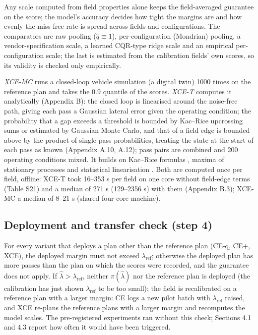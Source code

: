 \documentclass[preprint,12pt,authoryear]{elsarticle}
\begin{document}
Any scale computed from field properties alone keeps the field-averaged guarantee on the score; the model's accuracy decides how tight the margins are and how evenly the miss-free rate is spread across fields and configurations. The comparators are raw pooling (\(\hat q\equiv1\)), per-configuration (Mondrian) pooling, a vendor-specification scale, a learned CQR-type ridge scale \citep{romano2019} and an empirical per-configuration scale; the last is estimated from the calibration fields' own scores, so its validity is checked only empirically.

\emph{XCE-MC} runs a closed-loop vehicle simulation (a digital twin) 1000 times on the reference plan and takes the 0.9 quantile of the scores. \emph{XCE-T} computes it analytically (Appendix B): the closed loop is linearised around the noise-free path, giving each pass a Gaussian lateral error given the operating condition; the probability that a gap exceeds a threshold is bounded by Kac--Rice upcrossing sums or estimated by Gaussian Monte Carlo, and that of a field edge is bounded above by the product of single-pass probabilities, treating the state at the start of each pass as known (Appendix A.10, A.12); pass pairs are combined and 200 operating conditions mixed. It builds on Kac--Rice formulas \citep{azais2009,piterbarg1996}, maxima of stationary processes \citep{leadbetter1983,hall1979} and statistical linearisation \citep{booton1954,kazakov1956}. Both are computed once per field, offline: XCE-T took 16--353 s per field on one core without field-edge terms (Table S21) and a median of 271 s (129--2356 s) with them (Appendix B.3); XCE-MC a median of 8--21 s (shared four-core machine).

\subsection{Deployment and transfer check (step 4)}

For every variant that deploys a plan other than the reference plan (CE-q, CE+, XCE), the deployed margin must not exceed \(\lambda_\mathrm{ref}\); otherwise the deployed plan has more passes than the plan on which the scores were recorded, and the guarantee does not apply. If \(\hat\lambda>\lambda_\mathrm{ref}\), neither \(\pi(\hat\lambda)\) nor the reference plan is deployed (the calibration has just shown \(\lambda_\mathrm{ref}\) to be too small); the field is recalibrated on a reference plan with a larger margin: CE logs a new pilot batch with \(\lambda_\mathrm{ref}\) raised, and XCE re-plans the reference plans with a larger margin and recomputes the model scales. The pre-registered experiments ran without this check; Sections 4.1 and 4.3 report how often it would have been triggered.
\end{document}
